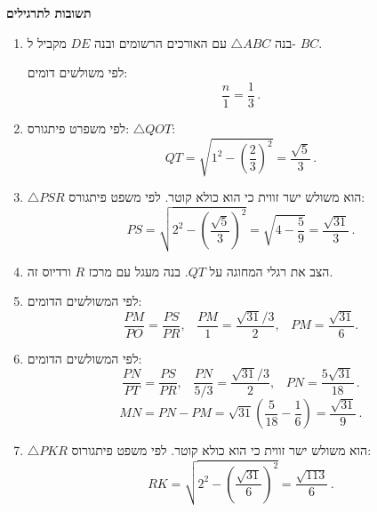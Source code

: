 \np


\begin{center}
\textbf{\Large תשובות לתרגילים}
\end{center}

\begin{enumerate}

\item
בנה
$\triangle ABC$
עם האורכים הרשומים ובנה 
$DE$
מקביל ל-%
$BC$. 
\begin{center}
\end{center}
לפי משולשים דומים:
\[
\frac{n}{1} = \frac{1}{3}\,.
\]
\item
לפי משפרט פיתגורס:
$\triangle QOT$:
\[
QT = \sqrt{1^2-\left(\frac{2}{3}\right)^2}=\frac{\sqrt{5}}{3}\,.
\]

\item $\triangle PSR$
הוא משולש ישר זווית כי הוא כולא קוטר. לפי משפט פיתגורס:
\[
PS = \sqrt{2^2-\left(\frac{\sqrt{5}}{3}\right)^2}=\sqrt{4-\frac{5}{9}}=\frac{\sqrt{31}}{3}\,.
\]

\item
הצב את רגלי המחוגה על 
$QT$.
בנה מעגל עם מרכז 
$R$
ורדיוס זה.

\item
לפי המשולשים הדומים:
\[
\frac{PM}{PO}=\frac{PS}{PR},\;\;\;\frac{PM}{1}=\frac{\sqrt{31}/3}{2},\;\;\;PM=\frac{\sqrt{31}}{6}.
\]

\item
לפי המשולשים הדומים:
\[
\frac{PN}{PT}=\frac{PS}{PR},\;\;\;\frac{PN}{5/3}=\frac{\sqrt{31}/3}{2},\;\;\;PN=\frac{5\sqrt{31}}{18}\,.
\]
\[
MN=PN-PM = \sqrt{31}\left(\frac{5}{18}-\frac{1}{6}\right) = \frac{\sqrt{31}}{9}\,.
\]

\item $\triangle PKR$
הוא משולש ישר זווית כי הוא כולא קוטר. לפי משפט פיתגורוס:
\[
RK=\sqrt{2^2-\left(\frac{\sqrt{31}}{6}\right)^2} = \frac{\sqrt{113}}{6}\,.
\]


\end{enumerate}

